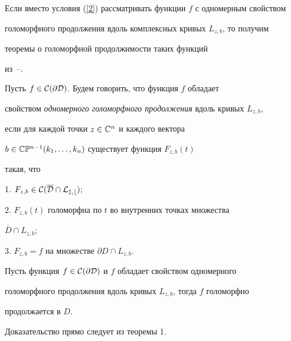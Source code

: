 Если вместо условия (\ref{2}) рассматривать функции $f$ с одномерным свойством


голоморфного продолжения вдоль комплексных кривых $L_{z,b}$, то  получим


теоремы о голоморфной продолжимости таких функций


из~\cite{KM1}--\cite{S}.





Пусть $f\in\cal{C}(\partial D)$. Будем говорить, что функция $f$ обладает


свойством {\it одномерного голоморфного продолжения} вдоль кривых $L_{z,b}$,


если для каждой точки $z\in\Bbb{C}^n$ и каждого вектора


$b\in\Bbb C\Bbb P^{n-1}(k_1,\dotsc,k_n)$ существует функция $F_{z,b}(t)$


такая, что





1. $F_{z,b}\in\cal C(\overline D\cap L_{z,b})$;





2. $F_{z,b}(t)$ голоморфна по $t$ во внутренних точках множества


$\overline D\cap L_{z,b}$;





3. $F_{z,b}=f$ на множестве $\partial D\cap L_{z,b}$.





\begin{thm}


Пусть функция $f\in\cal C(\partial D)$ и $f$ обладает свойством одномерного


голоморфного продолжения вдоль кривых $L_{z,b}$, тогда $f$ голоморфно


продолжается в $D$.


\end{thm}





Доказательство прямо следует из теоремы 1.





